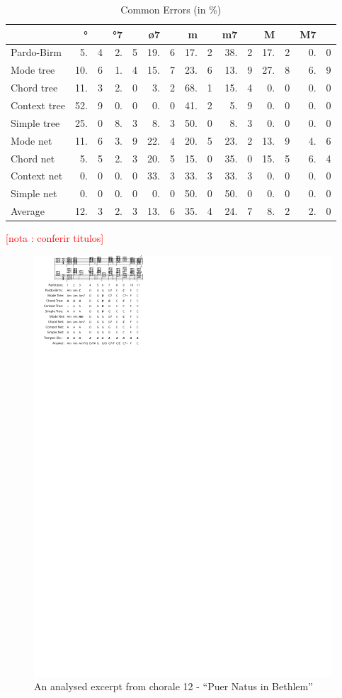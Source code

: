 \documentclass{article}
\newcounter{notacounter}
\newcommand{\nota}[1]{
  \addtocounter{notacounter}{1}
  \textcolor{red}{[nota \arabic{notacounter}: #1]}
}
\begin{document}
\begin{table}
  \centering
  \begin{tabular}{l|r@{}p{.001cm}r@{}p{.001cm}r@{}p{.001cm}r@{}p{.001cm}r@{}p{.001cm}r@{}p{.001cm}r@{}p{.001cm}}
                 &   °&&  °7&&  ø7&&   m&&  m7&&   M&&  M7 &\\
    \hline
    Pardo-Birm   & 5.&4& 2.&5&19.&6&17.&2&38.&2&17.&2& 0.&0\\
    Mode tree    &10.&6& 1.&4&15.&7&23.&6&13.&9&27.&8& 6.&9\\
    Chord tree   &11.&3& 2.&0& 3.&2&68.&1&15.&4& 0.&0& 0.&0\\
    Context tree &52.&9& 0.&0& 0.&0&41.&2& 5.&9& 0.&0& 0.&0\\
    Simple tree  &25.&0& 8.&3& 8.&3&50.&0& 8.&3& 0.&0& 0.&0\\
    Mode net     &11.&6& 3.&9&22.&4&20.&5&23.&2&13.&9& 4.&6\\
    Chord net    & 5.&5& 2.&3&20.&5&15.&0&35.&0&15.&5& 6.&4\\
    Context net  & 0.&0& 0.&0&33.&3&33.&3&33.&3& 0.&0& 0.&0\\
    Simple net   & 0.&0& 0.&0& 0.&0&50.&0&50.&0& 0.&0& 0.&0\\
    Average      &12.&3& 2.&3&13.&6&35.&4&24.&7& 8.&2& 2.&0\\ 
  \end{tabular}
  \caption{Common Errors (in \%)}
  \label{tab:common-errors}
\end{table}


\nota{conferir titulos}

\begin{figure}
  \centering
  \includegraphics[scale=4]{coral-012}
  \caption{An analysed excerpt from chorale 12 - ``Puer Natus in Bethlem''}
  \label{fig:coral-12}
\end{figure}
\end{document}
